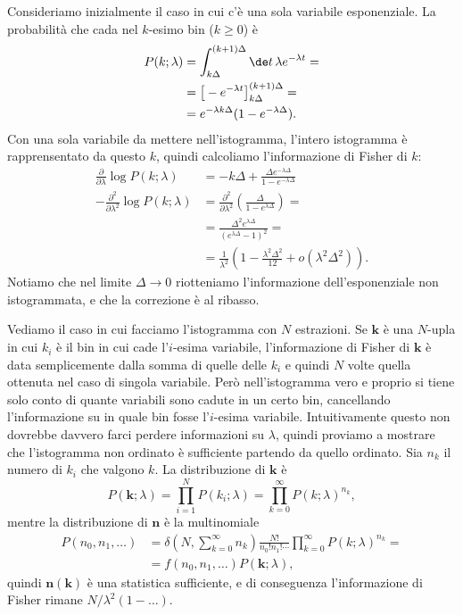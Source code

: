 \begin{solution}
    Consideriamo inizialmente il caso in cui c'è una sola variabile
    esponenziale. La probabilità che cada nel $k$-esimo bin ($k\ge 0$) è
	\begin{align*}
		P(k;\lambda)
		&= \int_{k\Delta}^{(k+1)\Delta}\de t\, \lambda e^{-\lambda t} = \\
		&= \big[-e^{-\lambda t}\big]_{k\Delta}^{(k+1)\Delta} = \\
		&= e^{-\lambda k\Delta}(1-e^{-\lambda\Delta}).
	\end{align*}
    Con una sola variabile da mettere nell'istogramma, l'intero istogramma è
    rapprensentato da questo $k$, quindi calcoliamo l'informazione di Fisher di
    $k$:
	\begin{align*}
		\frac{\partial}{\partial\lambda} \log P(k;\lambda)
		&= -k\Delta + \frac{\Delta e^{-\lambda\Delta}}{1-e^{-\lambda\Delta}} \\
		-\frac{\partial^2}{\partial\lambda^2} \log P(k;\lambda)
		&= \frac{\partial^2}{\partial\lambda^2}
		\left( \frac{\Delta}{1-e^{\lambda\Delta}} \right) = \\
		&= \frac {\Delta^2 e^{\lambda\Delta}} {(e^{\lambda\Delta}-1)^2} = \\
		&= \frac1{\lambda^2} \left( 1 - \frac{\lambda^2\Delta^2}{12} + o(\lambda^2\Delta^2) \right).
	\end{align*}
    Notiamo che nel limite $\Delta\to 0$ riotteniamo l'informazione
    dell'esponenziale non istogrammata, e che la correzione è al ribasso.
    
    Vediamo il caso in cui facciamo l'istogramma con $N$ estrazioni. Se
    $\mathbf k$ è una $N$-upla in cui $k_i$ è il bin in cui cade l'$i$-esima
    variabile, l'informazione di Fisher di $\mathbf k$ è data semplicemente
    dalla somma di quelle delle $k_i$ e quindi $N$ volte quella ottenuta nel
    caso di singola variabile. Però nell'istogramma vero e proprio si tiene
    solo conto di quante variabili sono cadute in un certo bin, cancellando
    l'informazione su in quale bin fosse l'$i$-esima variabile. Intuitivamente
    questo non dovrebbe davvero farci perdere informazioni su $\lambda$,
    quindi proviamo a mostrare che l'istogramma non ordinato è sufficiente
    partendo da quello ordinato. Sia $n_k$ il numero di $k_i$ che valgono $k$.
    La distribuzione di $\mathbf k$ è
    \begin{equation*}
        P(\mathbf k;\lambda) = \prod_{i=1}^N P(k_i;\lambda)
        = \prod_{k=0}^\infty P(k;\lambda)^{n_k},
    \end{equation*}
    mentre la distribuzione di $\mathbf n$ è la multinomiale
    \begin{align*}
        P(n_0,n_1,\ldots) &=
        \delta\left(N, \sum_{k=0}^\infty n_k\right)
        \frac{N!}{n_0!n_1!\cdots} \prod_{k=0}^\infty P(k;\lambda)^{n_k} = \\
        &= f(n_0,n_1,\ldots) P(\mathbf k;\lambda),
    \end{align*}
    quindi $\mathbf n(\mathbf k)$ è una statistica sufficiente, e di
    conseguenza l'informazione di Fisher rimane $N/\lambda^2(1-\ldots)$.
\end{solution}
